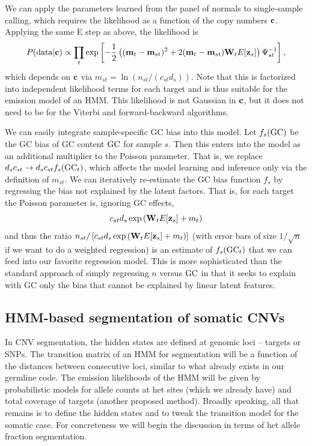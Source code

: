 \documentclass[nofootinbib,amssymb,amsmath]{revtex4}
\newcommand{\vc}{{\bf c}}
\newcommand{\vz}{{\bf z}}
\newcommand{\vm}{{\bf m}}
\newcommand{\vW}{{\bf W}}
\begin{document}
We can apply the parameters learned from the panel of normals to single-sample calling, which requires the likelihood as a function of the copy numbers $\vc$.  Applying the same E step as above, the likelihood is
\begin{equation}
P({\rm data} | \vc) \propto \prod_t \exp \left[ -\frac{1}{2} \left(  (\vm_t - \vm_{st})^2 +2 (\vm_t - \vm_{st}) \vW_{t} E[\vz_{s}] \right)\Psi_{st}^{-1} \right],
\end{equation}
which depends on $\vc$ via $m_{st} = \ln \left( n_{st} / (c_{st} d_s) \right)$.  Note that this is factorized into independent likelihood terms for each target and is thus suitable for the emission model of an HMM.  This likelihood is not Gaussian in $\vc$, but it does not need to be for the Viterbi and forward-backward algorithms.

We can easily integrate sample-specific GC bias into this model.  Let $f_s({\rm GC})$ be the GC bias of GC content ${\rm GC}$ for sample $s$.  Then this enters into the model as an additional multiplier to the Poisson parameter.  That is, we replace $d_s c_{st} \rightarrow d_s c_{st} f_s({\rm GC}_t)$, which affects the model learning and inference only via the definition of $m_{st}$.  We can iteratively re-estimate the GC bias function $f_s$ by regressing the bias not explained by the latent factors.  That is, for each target the Poisson parameter is, ignoring GC effects,
\begin{equation}
c_{st} d_s \exp \left( \vW_t E[\vz_s] + m_t \right)
\end{equation}
and thus the ratio $n_{st} / \left[ c_{st} d_s \exp \left( \vW_t E[\vz_s] + m_t \right) \right]$ (with error bars of size $1/\sqrt{n}$ if we want to do a weighted regression) is an estimate of $f_s({\rm GC}_t)$ that we can feed into our favorite regression model.  This is more sophisticated than the standard approach of simply regressing $n$ versus ${\rm GC}$ in that it seeks to explain with GC only the bias that cannot be explained by linear latent features.


\subsection{HMM-based segmentation of somatic CNVs} \label{HMM-segmentation}
In CNV segmentation, the hidden states are defined at genomic loci -- targets or SNPs.  The transition matrix of an HMM for segmentation will be a function of the distances between consecutive loci, similar to what already exists in our germline code.  The emission likelihoods of the HMM will be given by probabilistic models for allele counts at het sites (which we already have) and total coverage of targets (another proposed method).  Broadly speaking, all that remains is to define the hidden states and to tweak the transition model for the somatic case.  For concreteness we will begin the discussion in terms of het allele fraction segmentation.
\end{document}
